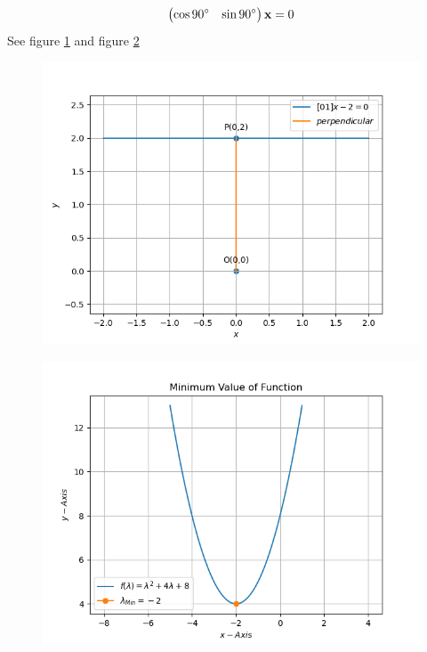 \documentclass[12pt]{article}
\newcommand{\myvec}[1]{\ensuremath{\begin{pmatrix}#1\end{pmatrix}}}
\let\vec\mathbf
\begin{document}
\begin{align}
	\myvec{\cos{90}\degree&\sin{90}\degree}\vec{x} = 0
\end{align}
See figure \ref{fig:Fig1} and figure \ref{fig:Fig2}
\begin{figure}[!h]
	\begin{center} 
	    \includegraphics[width=\columnwidth]{figs/opt1}
	\end{center}
\caption{}
\label{fig:Fig1}
\end{figure}
\begin{figure}[!h]
	\begin{center} 
	    \includegraphics[width=\columnwidth]{figs/opt2}
	\end{center}
\caption{}
\label{fig:Fig2}
\end{figure}
\end{document}
